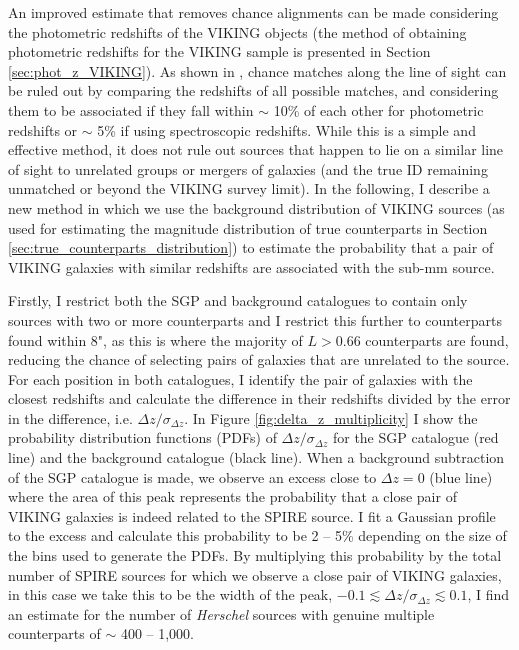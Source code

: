 An improved estimate that removes chance alignments can be made considering the photometric redshifts of the VIKING objects (the method of obtaining photometric redshifts for the VIKING sample is presented in Section \ref{sec:phot_z_VIKING}). As shown in \citealt{Fleuren_2012}, chance matches along the line of sight can be ruled out by comparing the redshifts of all possible matches, and considering them to be associated if they fall within $\sim$ 10\% of each other for photometric redshifts or $\sim$ 5\% if using spectroscopic redshifts. While this is a simple and effective method, it does not rule out sources that happen to lie on a similar line of sight to unrelated groups or mergers of galaxies (and the true ID remaining unmatched or beyond the VIKING survey limit). In the following, I describe a new method in which we use the background distribution of VIKING sources (as used for estimating the magnitude distribution of true counterparts in Section \ref{sec:true_counterparts_distribution}) to estimate the probability that a pair of VIKING galaxies with similar redshifts are associated with the sub-mm source. 

Firstly, I restrict both the SGP and background catalogues to contain only sources with two or more counterparts and I restrict this further to counterparts found within 8", as this is where the majority of $L > 0.66$ counterparts are found, reducing the chance of selecting pairs of galaxies that are unrelated to the source. For each position in both catalogues, I identify the pair of galaxies with the closest redshifts and calculate the difference in their redshifts divided by the error in the difference, i.e. $\Delta z/\sigma_{\Delta z}$. In Figure \ref{fig:delta_z_multiplicity} I show the probability distribution functions (PDFs) of $\Delta z/\sigma_{\Delta z}$ for the SGP catalogue (red line) and the background catalogue (black line). When a background subtraction of the SGP catalogue is made, we observe an excess close to $\Delta z = 0$ (blue line) where the area of this peak represents the probability that a close pair of VIKING galaxies is indeed related to the SPIRE source. I fit a Gaussian profile to the excess and calculate this probability to be 2 -- 5\% depending on the size of the bins used to generate the PDFs. By multiplying this probability by the total number of SPIRE sources for which we observe a close pair of VIKING galaxies, in this case we take this to be the width of the peak, $-0.1 \lesssim \Delta z/\sigma_{\Delta z} \lesssim 0.1$, I find an estimate for the number of \textit{Herschel} sources with genuine multiple counterparts of $\sim$ 400 -- 1,000.

